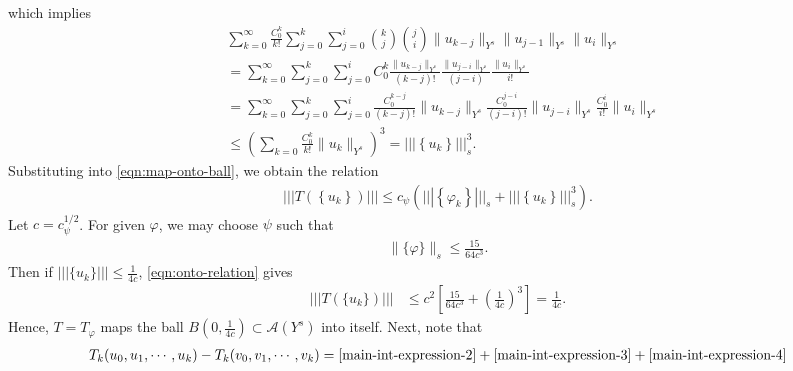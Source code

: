 \documentclass[12pt,reqno]{amsart}
\numberwithin{equation}{section}  %
\numberwithin{figure}{section}
\newcommand{\vp}{\varphi}
\theoremstyle{plain}
\theoremstyle{definition}
\theoremstyle{remark}
\begin{document}
%
%
which implies 
%
%
\begin{equation}
\begin{split}
  & \sum_{k=0}^{\infty} \frac{C_0^k}{k!} \sum_{j=0}^{k}  \sum_{j=0}^{i} {k \choose j } {j \choose i } \|u_{k-j}\|_{Y^s}
\| u_{j-1}\|_{Y^s} \| u_{i} \|_{Y^s} 
\\
& = \sum_{k=0}^{\infty} \sum_{j=0}^{k}  \sum_{j=0}^{i} C_{0}^{k} \frac{\|
u_{k-j} \|_{Y^s}}{(k-j)!} \frac{\| u_{j-i} \|_{Y^s}}{(j-i)} \frac{\|
u_{i} \|_{Y^s}}{i!}
\\
& = \sum_{k=0}^{\infty} \sum_{j=0}^{k}  \sum_{j=0}^{i}
\frac{C_{0}^{k-j}}{(k-j)!} \| u_{k-j} \|_{Y^s} \frac{C_{0}^{j-i}}{(j-i)!}\|
u_{j-i} \|_{Y^s} \frac{C_{0}^{i}}{i!} \| u_{i} \|_{Y^s}
\\
& \le \left( \sum_{k=0} \frac{C_0^k}{k!} \| u_{k} \|_{Y^s} \right)^{3}
= | | | \left\{ u_{k} \right\} | | |^3_{s}.
\label{eqn:low-dim-to-high-comp}
\end{split}
\end{equation}
%
%
Substituting into \eqref{eqn:map-onto-ball}, we obtain the relation
%
%
\begin{equation}
\begin{split}
  | | | T(\left\{ u_{k} \right\}) | | |
  \le c_{\psi} \left( | | | \left\{ \vp_{k} \right\} | | |_{s} +
  | | | \left\{ u_{k} \right\} | | |^3_{s} \right ).
\end{split}
\label{eqn:onto-relation}
\end{equation}
%
%
Let $c = c_{\psi}^{1/2}$. For given $\vp$, we may choose $\psi$ such
that 
%
\begin{equation*}
  \begin{split}
    \|\{\vp\}\|_{s} \le \frac{15}{64c^3}.
  \end{split}
\end{equation*}
%
Then if $| | |\{u_k\} | | | \le \frac{1}{4c}$, \eqref{eqn:onto-relation} gives
%
\begin{equation*}
  \begin{split}
    |  | |T (\{u_k \}) | | |
    & \le c^2 \left[ \frac{15}{64c^3} + \left( 
    \frac{1}{4c} \right)^3 \right]
    =  \frac{1}{4c}.
  \end{split}
\end{equation*}
%
Hence, $T=T_{\vp}$ maps the ball $B\left( 0, \frac{1}{4c} \right) \subset
\mathcal{A}(Y^s)$ into 
itself. Next, note that
%
\begin{equation*}
  \begin{split}
    T_k(u_0, u_1,\cdots,u_k) - T_k(v_0, v_1, \cdots, v_k)
    = \eqref{main-int-expression-2} + \eqref{main-int-expression-3} 
    + \eqref{main-int-expression-4}
  \end{split}
\end{equation*}
\end{document}
